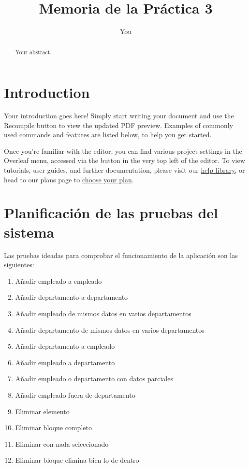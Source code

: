\documentclass{article}
\title{Memoria de la Práctica 3}
\author{You}
\begin{document}
\maketitle

\begin{abstract}
Your abstract.
\end{abstract}

\section{Introduction}

Your introduction goes here! Simply start writing your document and use the Recompile button to view the updated PDF preview. Examples of commonly used commands and features are listed below, to help you get started.

Once you're familiar with the editor, you can find various project settings in the Overleaf menu, accessed via the button in the very top left of the editor. To view tutorials, user guides, and further documentation, please visit our \href{https://www.overleaf.com/learn}{help library}, or head to our plans page to \href{https://www.overleaf.com/user/subscription/plans}{choose your plan}.

\section{Planificación de las pruebas del sistema}

Las pruebas ideadas para comprobar el funcionamiento de la aplicación son las siguientes:

\begin{enumerate}
    \item Añadir empleado a empleado
    \item Añadir departamento a departamento
    \item Añadir empleado de mismos datos en varios departamentos
    \item Añadir departamento de mismos datos en varios departamentos
    \item Añadir departamento a empleado
    \item Añadir empleado a departamento
    \item Añadir empleado o departamento con datos parciales
    \item Añadir empleado fuera de departamento
    \item Eliminar elemento
    \item Eliminar bloque completo
    \item Eliminar con nada seleccionado
    \item Eliminar bloque elimina bien lo de dentro
\end{enumerate}
\end{document}
